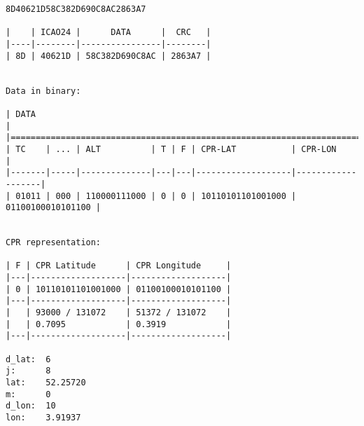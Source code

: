 \begin{verbatim}
8D40621D58C382D690C8AC2863A7

|    | ICAO24 |      DATA      |  CRC   |
|----|--------|----------------|--------|
| 8D | 40621D | 58C382D690C8AC | 2863A7 |


Data in binary:

| DATA                                                                       |
|============================================================================|
| TC    | ... | ALT          | T | F | CPR-LAT           | CPR-LON           |
|-------|-----|--------------|---|---|-------------------|-------------------|
| 01011 | 000 | 110000111000 | 0 | 0 | 10110101101001000 | 01100100010101100 |


CPR representation:

| F | CPR Latitude      | CPR Longitude     |
|---|-------------------|-------------------|
| 0 | 10110101101001000 | 01100100010101100 |
|---|-------------------|-------------------|
|   | 93000 / 131072    | 51372 / 131072    |
|   | 0.7095            | 0.3919            |
|---|-------------------|-------------------|

d_lat:  6
j:      8
lat:    52.25720
m:      0
d_lon:  10
lon:    3.91937
\end{verbatim}
